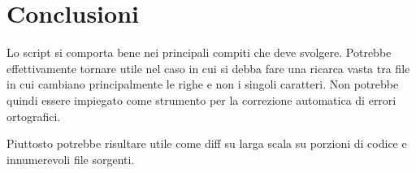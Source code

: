 \documentclass[a4paper,10pt]{article}
\begin{document}
\section{Conclusioni}
Lo script si comporta bene nei principali compiti che deve svolgere. Potrebbe effettivamente tornare utile nel caso in cui si debba fare
una ricarca vasta tra file in cui cambiano principalmente le righe e non i singoli caratteri. Non potrebbe quindi essere impiegato
come strumento per la correzione automatica di errori ortografici.

Piuttosto potrebbe risultare utile come diff su larga scala su porzioni di codice e innumerevoli file sorgenti.
\end{document}
